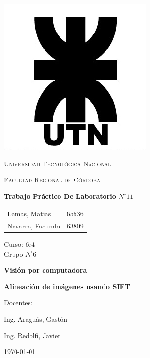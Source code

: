\documentclass[11pt, a4paper]{article}
\begin{document}
\begin{titlepage}
 \centering
	\includegraphics[scale=0.80]{Imagenes/LOGO.jpg} \par
 	\vspace{1cm}
 	{\scshape\LARGE Universidad Tecnológica Nacional \par}
 	{\scshape\large Facultad Regional de Córdoba \par}
 	\vspace{1cm}
	{\bfseries \Large Trabajo Práctico De Laboratorio $N^{\circ} 11$\par}
 	\vspace{1.5cm}

	\begin{tabular}{ll}
		Lamas, Matías		&	65536 	\\
		Navarro, Facundo	&	63809
	\end{tabular}
	
	\vspace{1cm}
	Curso: 6r4 \\
	Grupo $N^{\circ} 6$
 	\vfill
	{\bfseries \LARGE Visión por computadora\par}
	{\bfseries \Large Alineación de imágenes usando SIFT\par}
	\vspace{1.5cm}
	Docentes: \par
	Ing. Araguás, Gastón \par
	Ing. Redolfi, Javier \par

 	\vfill
	{\large \today\par}
\end{titlepage}
	
	
\tableofcontents
\clearpage
\end{document}
